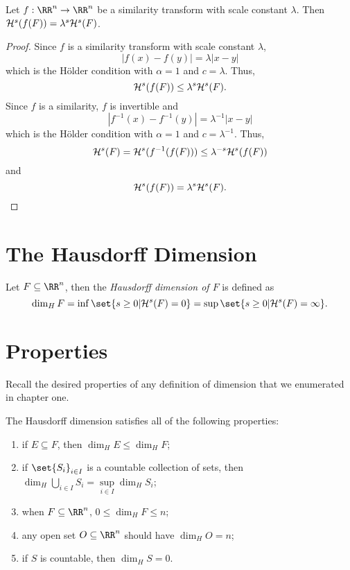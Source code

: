 \begin{thm}\label{hm-sim}
	Let $f:\RR^n\rightarrow\RR^n$ be a similarity transform with scale constant $\lambda$.
	Then $\mathcal{H}^s(f(F))=\lambda^s\mathcal{H}^s(F)$.
\end{thm}
\begin{proof}
	Since $f$ is a similarity transform with scale constant $\lambda$,
	\[
		|f(x)-f(y)|=\lambda|x-y|
	\]
	which is the H\"older condition with $\alpha=1$ and $c=\lambda$.
	Thus,
	\[
		\mathcal{H}^s(f(F))\leq \lambda^s\mathcal{H}^s(F).
	\]
	Since $f$ is a similarity, $f$ is invertible and
	\[
		|f^{-1}(x)-f^{-1}(y)|=\lambda^{-1}|x-y|
	\]
	which is the H\"older condition with $\alpha=1$ and $c=\lambda^{-1}$.
	Thus,
	\[
		\mathcal{H}^s(F)=\mathcal{H}^s(f^{-1}(f(F)))\leq\lambda^{-s}\mathcal{H}^s(f(F))
	\]
	and
	\[
		\mathcal{H}^s(f(F))=\lambda^s\mathcal{H}^s(F).
	\]
\end{proof}

\section{The Hausdorff Dimension}

\begin{definition}
	Let $F\subseteq\RR^n$, then the \textit{Hausdorff dimension of $F$} is defined as
	\[
		\dim_H F = \inf\set{s\geq 0 | \hm^s(F) = 0} = \sup\set{s\geq 0 | \hm^s(F)=\infty}.
	\]
\end{definition}

\section{Properties}

Recall the desired properties of any definition of dimension that we enumerated in chapter one.

\begin{thm}
	The Hausdorff dimension satisfies all of the following properties:
	\begin{enumerate}
		\item if $E\subseteq F$, then $\dim_H E\leq\dim_H F$;
		\item if $\set{S_i}_{i\in I}$ is a countable collection of sets, then $\dim_H \bigcup_{i\in I} S_i = \sup\limits_{i\in I}\dim_H S_i$;
		\item when $F\subseteq \RR^n$, $0\leq \dim_H F\leq n$;
		\item any open set $O\subseteq \RR^n$ should have $\dim_H O = n$;
		\item if $S$ is countable, then $\dim_H S=0$.
	\end{enumerate}
\end{thm}

